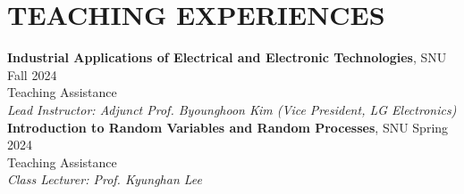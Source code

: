 \section*{TEACHING EXPERIENCES}

\noindent
\textbf{Industrial Applications of Electrical and Electronic Technologies}, SNU \hfill Fall 2024 \\
Teaching Assistance \\
\textit{Lead Instructor: Adjunct Prof. Byounghoon Kim (Vice President, LG Electronics)} \\


\noindent
\textbf{Introduction to Random Variables and Random Processes}, SNU \hfill Spring 2024 \\
Teaching Assistance \\
\textit{Class Lecturer: Prof. Kyunghan Lee} \\

